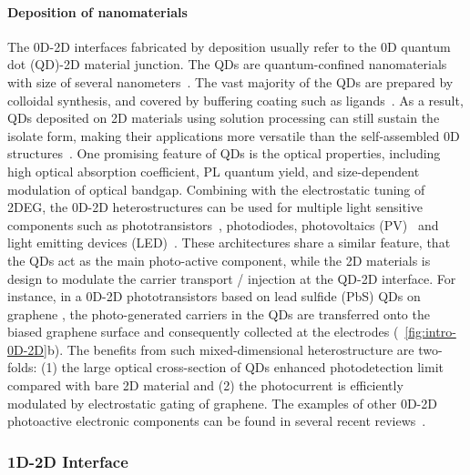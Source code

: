 \paragraph{Deposition of nano\-materials}


The 0D-2D interfaces fabricated by deposition usually refer to the 0D
quantum dot (QD)-2D material junction. The QDs are
quantum-confined nano\-materials with size of several
nano\-meters~\cite{Sargent_2013_colloidal_book}.
%
The vast majority of the QDs are prepared by colloidal synthesis, and
covered by buffering coating such as
ligands~\cite{Kim_2013_QD_rev}.
%
As a result, QDs deposited on 2D materials using solution processing
can still sustain the isolate form, making their applications more
versatile than the self-assembled 0D
structures~\cite{Jariwala_2016_mixed_vdw_het}.
%
One promising feature of QDs is the optical properties, including high
optical absorption coefficient, PL quantum yield, and size-dependent
modulation of optical bandgap.
%
Combining with the electrostatic tuning of 2DEG, the 0D-2D
heterostructures can be used for multiple light sensitive components
such as
photo\-transistors~\cite{Kufer_2014_QD-mos2,Konstantatos_2012_QD_gr_trans},
photo\-diodes\cite{Kufer_2014_QD-mos2}, photo\-voltaics
(PV)~\cite{Guo_2010_gr_QD_PV,Wang_2016_QD_PV} and light emitting
devices (LED)~\cite{Son_2012_ZnO-Gr-QD}.
%
These architectures share a similar feature, that the QDs act as the
main photo-active component, while the 2D materials is design to
modulate the carrier transport / injection at the QD-2D interface.
%
For instance, in a 0D-2D photo\-transistors based on lead sulfide
(PbS) QDs on graphene \cite{Konstantatos_2012_QD_gr_trans}, the
photo-generated carriers in the QDs are transferred onto the biased
graphene surface and consequently collected at the electrodes
(~\autoref{fig:intro-0D-2D}b). The benefits from such
mixed-dimensional heterostructure are two-folds: (1) the large optical
cross-section of QDs enhanced photo\-detection limit compared with
bare 2D material and (2) the photo\-current is efficiently modulated
by electrostatic gating of graphene.
%
The examples of other 0D-2D photo\-active electronic components can be
found in several recent
reviews~\cite{Jariwala_2016_mixed_vdw_het,Kufer_2016_QD_FET_rev}.


\subsubsection{1D-2D Interface}
\label{sec:orgeadf57e}

